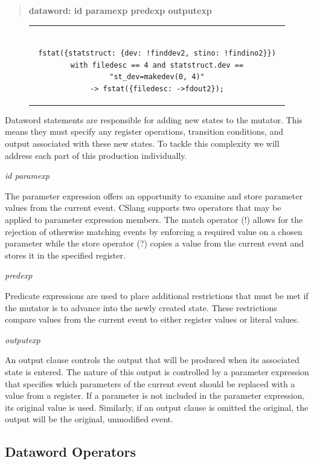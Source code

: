 \begin{quote}
\centering
\textbf{dataword: id paramexp predexp outputexp}
\end{quote}

\begin{figure}[H]
\centering
\begin{tabular}{c}
\begin{lstlisting}

fstat({statstruct: {dev: !finddev2, stino: !findino2}})
with filedesc == 4 and statstruct.dev == "st_dev=makedev(0, 4)"
-> fstat({filedesc: ->fdout2});

\end{lstlisting}
\end{tabular}
\end{figure}

Dataword statements are responsible for adding new states to the
mutator.  This means they must specify any register operations,
transition conditions, and output associated with these new states.  To
tackle this complexity we will address each part of this production
individually.

\textit{id paramexp}

The parameter expression offers an opportunity to examine and store
parameter values from the current event.  CSlang supports two operators
that may be applied to parameter expression members.  The match operator
(!) allows for the rejection of otherwise matching events
by enforcing a required value on a
chosen parameter while the store operator (?) copies a value from the
current event and stores it in the specified register.


\textit{predexp}

Predicate expressions are used to place additional restrictions that must
be met if the mutator is to advance into the newly created state.  These
restrictions compare values from the current event to either register
values or literal values.

\textit{outputexp}

An output clause controls the output that will be produced when its
associated state is entered.  The nature of this output is controlled by a
parameter expression that specifies which parameters of the current event
should be replaced with a value from a register.  If a parameter is not
included in the parameter expression, its original value is used.
Similarly,
if an output clause is omitted the original, the output will be the
original, unmodified event.

\subsection{Dataword Operators}
\label{sub:DatawordOperators}

